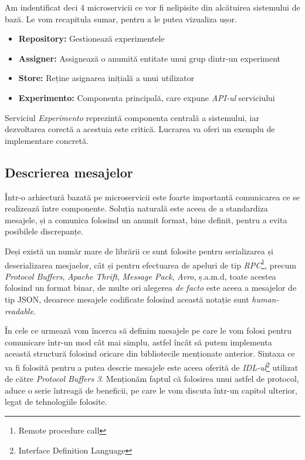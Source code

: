 Am indentificat deci 4 microservicii ce vor fi nelipisite din alcătuirea sistemului de bază. Le vom recapitula sumar, pentru a le putea vizualiza ușor.

\begin{itemize}
	\item \textbf{Repository:} Gestionează experimentele
	\item \textbf{Assigner:} Assignează o anumită entitate unui grup dintr-un experiment
	\item \textbf{Store:} Reține asignarea inițială a unui utilizator
	\item \textbf{Experimento:} Componenta principală, care expune \textit{API-ul} serviciului 
\end{itemize}

\begin{remark}
	Serviciul \textit{Experimento} reprezintă componenta centrală a sistemului, iar dezvoltarea corectă a acestuia este critică. Lucrarea va oferi un exemplu de implementare concretă.
\end{remark}

\subsection{Descrierea mesajelor}

Într-o arhiectură bazată pe microservicii este foarte importantă comunicarea ce se realizează între componente. Soluția naturală este aceea de a standardiza mesajele, și a comunica folosind un anumit format, bine definit, pentru a evita posibilele discrepanțe.

Deși există un număr mare de librării ce sunt folosite pentru serializarea și deserializarea mesjaelor, cât și pentru efectuarea de apeluri de tip \textit{RPC}\footnote{Remote procedure call}, precum \textit{Protocol Buffers}, \textit{Apache Thrift}, \textit{Message Pack}, \textit{Avro}, ș.a.m.d, toate acestea folosind un format binar, de multe ori alegerea \textit{de facto} este aceea a mesajelor de tip JSON, deoarece mesajele codificate folosind această notație sunt \textit{human-readable}.

În cele ce urmează vom încerca să definim mesajele pe care le vom folosi pentru comunicare într-un mod cât mai simplu, astfel încât să putem implementa această structură folosind oricare din bibliotecile menționate anterior. Sintaxa ce va fi folosită pentru a putea descrie mesajele este aceea oferită de \textit{IDL-ul}\footnote{Interface Definition Language} utilizat de către \textit{Protocol Buffers 3}. Menționăm faptul că folosirea unui astfel de protocol, aduce o serie întreagă de beneficii, pe care le vom discuta într-un capitol ulterior, legat de tehnologiile folosite.

